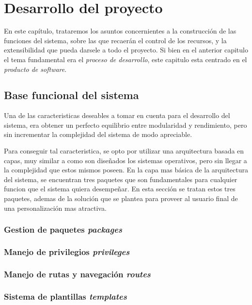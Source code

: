 \chapter{Desarrollo del proyecto}

En este capítulo, trataremos los asuntos concernientes a la construcción de las
funciones del sistema, sobre las que recaerán el control de los recursos, y la
extensibilidad que pueda darsele a todo el proyecto. Si bien en el anterior
capitulo el tema fundamental era el \emph{proceso de desarrollo}, este capitulo
esta centrado en el \emph{producto de software}.

\section{Base funcional del sistema}

Una de las caracteristicas deseables a tomar en cuenta para el desarrollo del
sistema, era obtener un perfecto equilibrio entre modularidad y rendimiento,
pero sin incrementar la complejidad del sistema de modo apreciable.

Para conseguir tal caracteristica, se opto por utilizar una arquitectura basada
en capas, muy similar a como son diseñados los sistemas operativos, pero sin
llegar a la complejidad que estos mismos poseen. En la capa mas básica de la
arquitectura del sistema, se encuentran tres paquetes que son fundamentales para
cualquier funcion que el sistema quiera desempeñar. En esta sección se tratan
estos tres paquetes, ademas de la solución que se plantea para proveer al
usuario final de una personalización mas atractiva.

\subsection{Gestion de paquetes \emph{packages}}


\subsection{Manejo de privilegios \emph{privileges}}
\subsection{Manejo de rutas y navegación \emph{routes}}
\subsection{Sistema de plantillas \emph{templates}}

